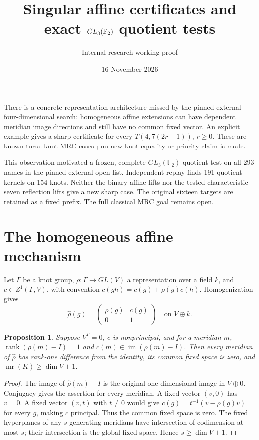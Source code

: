 \documentclass[11pt]{article}
\title{Singular affine certificates and exact $GL_3(\F_2)$ quotient tests}
\author{Internal research working proof}
\date{16 November 2026}
\newtheorem{proposition}[theorem]{Proposition}
\newcommand{\F}{\mathbb F}
\newcommand{\mr}{\operatorname{mr}}
\newcommand{\rank}{\operatorname{rank}}
\begin{document}
\maketitle

There is a concrete representation architecture missed by the pinned
external four-dimensional search: homogeneous affine extensions can
have dependent meridian image directions and still have no common
fixed vector. An explicit example gives a sharp certificate for every
$T(4,7(2r+1))$, $r\ge0$. These are known torus-knot MRC cases
\cite{rz}; no new knot equality or priority claim is made.

This observation motivated a frozen, complete $GL_3(\F_2)$ quotient
test on all 293 names in the pinned external open list. Independent
replay finds 191 quotient kernels on 154 knots. Neither the binary
affine lifts nor the tested characteristic-seven reflection lifts
give a new sharp case. The original sixteen targets are retained as
a fixed prefix. The full classical MRC goal remains open.

\section{The homogeneous affine mechanism}

Let $\Gamma$ be a knot group, $\rho:\Gamma\to GL(V)$ a representation
over a field $k$, and $c\in Z^1(\Gamma,V)$, with convention
$c(gh)=c(g)+\rho(g)c(h)$. Homogenization gives
\[
 \widehat\rho(g)=\begin{pmatrix}\rho(g)&c(g)\\0&1\end{pmatrix}
 \quad\text{on }V\oplus k.
\]

\begin{proposition}\label{prop:affine}
Suppose $V^\Gamma=0$, $c$ is nonprincipal, and for a meridian $m$,
$\rank(\rho(m)-I)=1$ and $c(m)\in\operatorname{im}(\rho(m)-I)$.
Then every meridian of $\widehat\rho$ has rank-one difference from
the identity, its common fixed space is zero, and
$\mr(K)\ge\dim V+1$.
\end{proposition}
\begin{proof}
The image of $\widehat\rho(m)-I$ is the original one-dimensional
image in $V\oplus0$. Conjugacy gives the assertion for every meridian.
A fixed vector $(v,0)$ has $v=0$. A fixed vector $(v,t)$ with
$t\ne0$ would give $c(g)=t^{-1}(v-\rho(g)v)$ for every $g$,
making $c$ principal. Thus the common fixed space is zero.
The fixed hyperplanes of any $s$ generating meridians have
intersection of codimension at most $s$; their intersection is the
global fixed space. Hence $s\ge\dim V+1$.
\end{proof}
\end{document}
